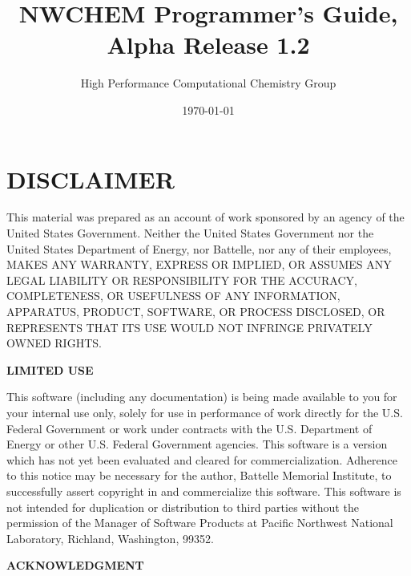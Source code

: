 \setlength{\parskip}{6pt}

\newcommand{\TRUE}{\verb+.true.+}
\newcommand{\FALSE}{\verb+.false.+}



\title{\bf\Large NWCHEM Programmer's Guide, Alpha Release 1.2}
\author{High Performance Computational Chemistry Group}
\date{\today}
\maketitle

\section*{\center DISCLAIMER}

This material was prepared as an account of work sponsored by an agency of the
United States Government.  Neither the United States Government nor the United
States Department of Energy, nor Battelle, nor any of their employees, MAKES
ANY WARRANTY, EXPRESS OR IMPLIED, OR ASSUMES ANY LEGAL LIABILITY OR
RESPONSIBILITY FOR THE ACCURACY, COMPLETENESS, OR USEFULNESS OF ANY
INFORMATION, APPARATUS, PRODUCT, SOFTWARE, OR PROCESS DISCLOSED, OR REPRESENTS
THAT ITS USE WOULD NOT INFRINGE PRIVATELY OWNED RIGHTS.


\begin{center}
{\bf LIMITED USE}
\end{center}

This software (including any documentation) is being made available to
you for your internal use only, solely for use in performance of work
directly for the U.S. Federal Government or work under contracts with
the U.S. Department of Energy or other U.S. Federal Government
agencies.  This software is a version which has not yet been evaluated
and cleared for commercialization.  Adherence to this notice may be
necessary for the author, Battelle Memorial Institute, to successfully
assert copyright in and commercialize this software.  This software is
not intended for duplication or distribution to third parties without
the permission of the Manager of Software Products at Pacific
Northwest National Laboratory, Richland, Washington, 99352.

\begin{center}
{\bf ACKNOWLEDGMENT}
\end{center}

